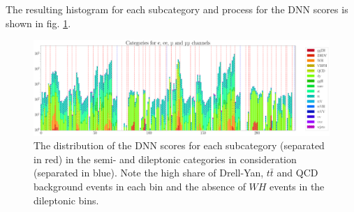 \Subsection{\textcolor{red}{Event Categorisation}}

The resulting histogram for each subcategory and process for the DNN scores is shown in fig. \ref{fig:conditions}.

\begin{figure}[h!]
	\centering
	\includegraphics[width=1.1\linewidth]{figures/analysis/cond4_notOrdered.pdf}
	\caption{The distribution of the DNN scores for each subcategory (separated in red) in the semi- and dileptonic categories in consideration (separated in blue). Note the high share of Drell-Yan, $t\bar{t}$ and QCD background events in each bin and the absence of $WH$ events in the dileptonic bins.}
	\label{fig:conditions}
\end{figure}